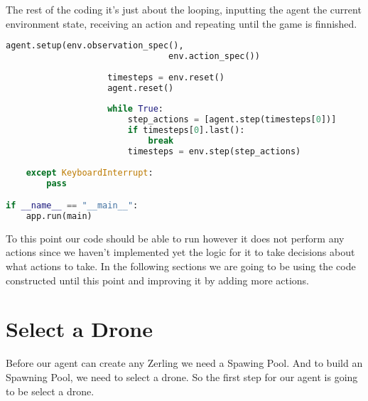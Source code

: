 \documentclass[11pt]{report}            %
\begin{document}
The rest of the coding it's just about the looping, inputting the agent the current environment state, receiving an action and repeating until the game is finnished.
\begin{lstlisting}[language=Python]
                    agent.setup(env.observation_spec(),
                                env.action_spec())
                
                    timesteps = env.reset()
                    agent.reset()
                
                    while True:
                        step_actions = [agent.step(timesteps[0])]
                        if timesteps[0].last():
                            break
                        timesteps = env.step(step_actions)
        
    except KeyboardInterrupt:
        pass

if __name__ == "__main__":
    app.run(main)
\end{lstlisting}
To this point our code should be able to run however it does not perform any actions since we haven't implemented yet the logic for it to take decisions about what actions to take. In the following sections we are going to be using the code constructed until this point and improving it by adding more actions.
\chapter{Select a Drone}
Before our agent can create any Zerling we need a Spawing Pool. And to build an Spawning Pool, we need to select a drone. So the first step for our agent is going to be select a drone.
\end{document}
